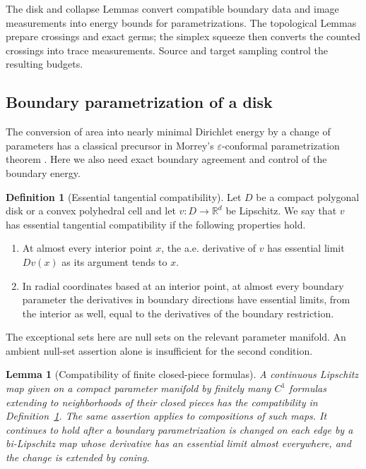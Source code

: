 \documentclass[11pt]{article}
\numberwithin{equation}{section}
\newtheorem{lemma}[theorem]{Lemma}
\theoremstyle{definition}
\newtheorem{definition}[theorem]{Definition}
\theoremstyle{remark}
\begin{document}
The disk and collapse Lemmas convert compatible boundary data and image
measurements into energy bounds for parametrizations.  The topological
Lemmas prepare crossings and exact germs; the simplex squeeze then
converts the counted crossings into trace measurements.  Source and
target sampling control the resulting budgets.

\subsection{Boundary parametrization of a disk}

The conversion of area into nearly minimal Dirichlet energy by a
change of parameters has a classical precursor in Morrey's
$\varepsilon$-conformal parametrization theorem
\cite[Chapter~I, Section~9, Theorem~1.2]{Morrey1948}. Here we also
need exact boundary agreement and control of the boundary energy.

\begin{definition}[Essential tangential compatibility]
\label{lt:compatibility}
Let $D$ be a compact polygonal disk or a convex polyhedral cell and let
$v:D\to\mathbb R^d$ be Lipschitz.  We say that $v$ has essential tangential
compatibility if the following properties hold.
\begin{enumerate}
\item At almost every interior point $x$, the a.e. derivative of $v$ has
essential limit $Dv(x)$ as its argument tends to $x$.
\item In radial coordinates based at an interior point, at almost every
boundary parameter the derivatives in boundary directions have essential
limits, from the interior as well, equal to the derivatives of the
boundary restriction.
\end{enumerate}
The exceptional sets here are null sets on the relevant parameter
manifold.  An ambient null-set assertion alone is insufficient for the
second condition.
\end{definition}

\begin{lemma}[Compatibility of finite closed-piece formulas]
\label{lt:closed-pieces}
A continuous Lipschitz map given on a compact parameter manifold by
finitely many $C^1$ formulas extending to neighborhoods of their closed
pieces has the compatibility in Definition~\ref{lt:compatibility}.
The same assertion applies to compositions of such maps.  It continues
to hold after a boundary parametrization is changed on each edge by a
bi-Lipschitz map whose derivative has an essential limit almost
everywhere, and the change is extended by coning.
\end{lemma}
\end{document}
